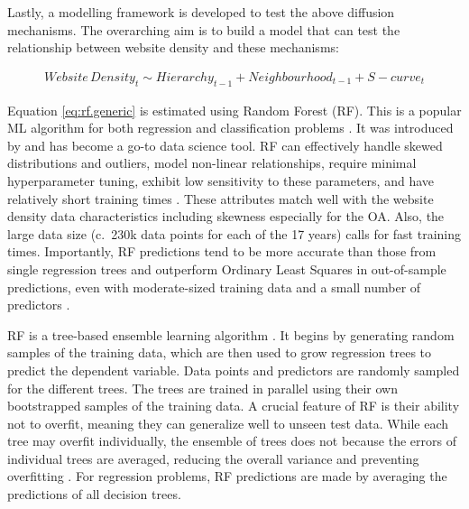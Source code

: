 \documentclass[
  authoryear,
  preprint,
  3p]{elsarticle}
\begin{document}
Lastly, a modelling framework is developed to test the above diffusion
mechanisms. The overarching aim is to build a model that can test the
relationship between website density and these mechanisms:

\begin{align}
Website\,Density_{t} \sim Hierarchy_{t-1} + Neighbourhood_{t-1} + S-curve_{t}\label{eq:rf.generic}
\end{align}

\noindent Equation \ref{eq:rf.generic} is estimated using Random Forest
(RF). This is a popular ML algorithm for both regression and
classification problems \citep{biau2012analysis}. It was introduced by
\citet{breiman2001random} and has become a go-to data science tool. RF
can effectively handle skewed distributions and outliers, model
non-linear relationships, require minimal hyperparameter tuning, exhibit
low sensitivity to these parameters, and have relatively short training
times \citep{Caruana2008, liaw2002classification, yan2020using}. These
attributes match well with the website density data characteristics
including skewness especially for the OA. Also, the large data size
(c.~230k data points for each of the 17 years) calls for fast training
times. Importantly, RF predictions tend to be more accurate than those
from single regression trees and outperform Ordinary Least Squares in
out-of-sample predictions, even with moderate-sized training data and a
small number of predictors
\citep{mullainathan2017machine, athey2019machine, sulaiman2011intelligent, pourebrahim2019trip, biau2012analysis}.

RF is a tree-based ensemble learning algorithm
\citep{breiman2001random}. It begins by generating random samples of the
training data, which are then used to grow regression trees to predict
the dependent variable. Data points and predictors are randomly sampled
for the different trees. The trees are trained in parallel using their
own bootstrapped samples of the training data. A crucial feature of RF
is their ability not to overfit, meaning they can generalize well to
unseen test data. While each tree may overfit individually, the ensemble
of trees does not because the errors of individual trees are averaged,
reducing the overall variance and preventing overfitting
\citep{last2002improving}. For regression problems, RF predictions are
made by averaging the predictions of all decision trees.
\end{document}
